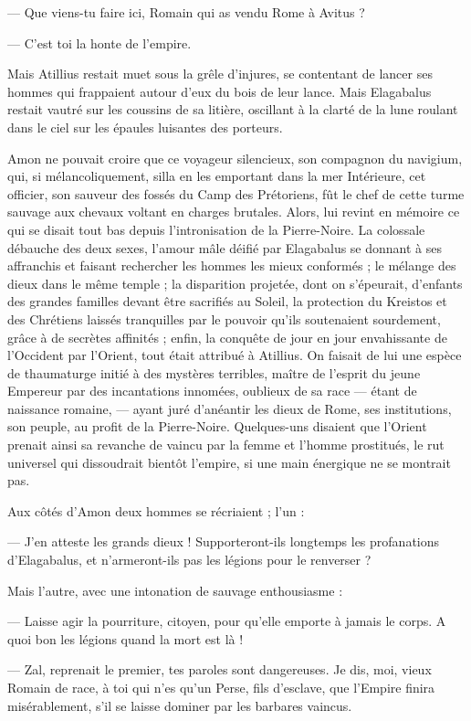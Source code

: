 \documentclass[a4paper, 11pt, oneside, polutonikogreek, french]{article}
\begin{document}
--- Que viens-tu faire ici, Romain qui as vendu Rome à Avitus ?

--- C'est toi la honte de l'empire.

Mais Atillius restait muet sous la grêle d'injures, se contentant de lancer ses hommes qui frappaient autour d'eux du bois de leur lance. Mais Elagabalus restait vautré sur les coussins de sa litière, oscillant à la clarté de la lune roulant dans le ciel sur les épaules luisantes des porteurs.

Amon ne pouvait croire que ce voyageur silencieux, son compagnon du navigium, qui, si mélancoliquement, silla en les emportant dans la mer Intérieure, cet officier, son sauveur des fossés du Camp des Prétoriens, fût le chef de cette turme sauvage aux chevaux voltant en charges brutales. Alors, lui revint en mémoire ce qui se disait tout bas depuis l'intronisation de la Pierre-Noire. La colossale débauche des deux sexes, l'amour mâle déifié par Elagabalus se donnant à ses affranchis et faisant rechercher les hommes les mieux conformés ; le mélange des dieux dans le même temple ; la disparition projetée, dont on s'épeurait, d'enfants des grandes familles devant être sacrifiés au Soleil, la protection du Kreistos et des Chrétiens laissés tranquilles par le pouvoir qu'ils soutenaient sourdement, grâce à de secrètes affinités ; enfin, la conquête de jour en jour envahissante de l'Occident par l'Orient, tout était attribué à Atillius. On faisait de lui une espèce de thaumaturge initié à des mystères terribles, maître de l'esprit du jeune Empereur par des incantations innomées, oublieux de sa race --- étant de naissance romaine, --- ayant juré d'anéantir les dieux de Rome, ses institutions, son peuple, au profit de la Pierre-Noire. Quelques-uns disaient que l'Orient prenait ainsi sa revanche de vaincu par la femme et l'homme prostitués, le rut universel qui dissoudrait bientôt l'empire, si une main énergique ne se montrait pas.

Aux côtés d'Amon deux hommes se récriaient ; l'un :

--- J'en atteste les grands dieux ! Supporteront-ils longtemps les profanations d'Elagabalus, et n'armeront-ils pas les légions pour le renverser ?

Mais l'autre, avec une intonation de sauvage enthousiasme :

--- Laisse agir la pourriture, citoyen, pour qu'elle emporte à jamais le corps. A quoi bon les légions quand la mort est là !

--- Zal, reprenait le premier, tes paroles sont dangereuses. Je dis, moi, vieux Romain de race, à toi qui n'es qu'un Perse, fils d'esclave, que l'Empire finira misérablement, s'il se laisse dominer par les barbares vaincus.
\end{document}
